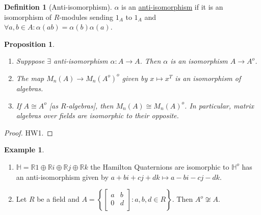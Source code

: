 \documentclass{article}
\theoremstyle{definition}
\newtheorem*{example}{Example}
\newtheorem*{definition}{Definition}
\theoremstyle{plain}
\newtheorem{proposition}[theorem]{Proposition}
\theoremstyle{remark}
\begin{document}
    \begin{definition}
        [Anti-isomorphism] \(\alpha\) is an \underline{anti-isomorphism} if it is an isomorphism of \(R\)-modules sending \(1_A\) to \(1_A\) and \(\forall a,b \in A \colon \alpha (ab) = \alpha(b) \alpha(a)\).
    \end{definition}

    \begin{proposition}
        \begin{enumerate}[label=\roman*)]
            \item Supppose \(\exists\) anti-isomorphism \(\alpha : A \to A\). Then \(\alpha\) is an isomorphism \(A \to A^o\).
            \item The map \(M_n(A) \to M_n(A^o)^o\) given by \(x \mapsto x^T\) is an isomorphism of algebras.
            \item If \(A\cong A^o\) [as \(R\)-algebras], then \(M_n(A) \cong M_n(A)^o\). In particular, matrix algebras over fields are isomorphic to their opposite. 
        \end{enumerate} 
    \end{proposition}

    \begin{proof}
        HW1.
    \end{proof}

    \begin{example}
        \begin{enumerate}[label=\arabic*)]
            \item \(\mathbb{H} = \mathbb{R} 1 \oplus \mathbb{R} i \oplus \mathbb{R} j \oplus \mathbb{R} k\) the Hamilton Quaternions are isomorphic to \(\mathbb{H}^o\) has an anti-isomorphism given by \(a + bi + cj + dk \mapsto a - bi - cj - dk\). 
            \item Let \(R\) be a field and \(A = \left\{ \begin{bmatrix}
                a & b \\
                0 & d \\
            \end{bmatrix} : a,b,d\in R \right\}\). Then \(A^o \not\cong A\).
        \end{enumerate} 
    \end{example}
\end{document}
